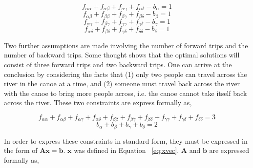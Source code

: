 \documentclass{article}
\begin{document}
\begin{equation} \label{eq:oppo-the-river-consts}
f_{\alpha \alpha} + f_{\alpha \beta} + f_{\alpha \gamma} + f_{\alpha \delta} - b_{\alpha} = 1
\end{equation}
\begin{equation*}
f_{\alpha \beta} + f_{\beta \beta} + f_{\beta \gamma} + f_{\beta \delta} - b_{\beta} = 1 
\end{equation*}
\begin{equation*}
f_{\alpha \gamma} + f_{\beta \gamma} + f_{\gamma \gamma} + f_{\gamma \delta} - b_{\gamma} = 1
\end{equation*}
\begin{equation*}
f_{\alpha \delta} + f_{\beta \delta} + f_{\gamma \delta} + f_{\delta \delta} - b_{\delta} = 1
\end{equation*}

Two further assumptions are made involving the number of forward trips and the number of backward trips.
Some thought shows that the optimal solutions will consist of three forward trips and two backward trips.
One can arrive at the conclusion by considering the facts that (1) only two people can travel across the river in the canoe at a time, and (2) someone must travel back across the river with the canoe to bring more people across, i.e. the canoe cannot take itself back across the river.
These two constraints are express formally as,

\begin{equation}
f_{\alpha \alpha} + f_{\alpha \beta} + f_{\alpha \gamma} + f_{\alpha \delta} + f_{\beta \beta} + f_{\beta \gamma} + f_{\beta \delta} + f_{\gamma \gamma} + f_{\gamma \delta} + f_{\delta \delta} = 3
\end{equation}
\begin{equation*}
b_{\alpha} + b_{\beta} + b_{\gamma} + b_{\delta} = 2
\end{equation*}

In order to express these constraints in standard form, they must be expressed in the form of $\mathbf{A} \mathbf{x} = \mathbf{b}$.
$\mathbf{x}$ was defined in Equation ~\ref{eq:xvec}. $\mathbf{A}$ and $\mathbf{b}$ are expressed formally as,
\end{document}

